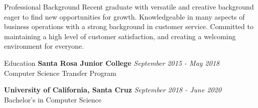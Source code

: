 \documentclass{resume} %
\begin{document}

\begin{rSection}{Professional Background}
    Recent graduate with versatile and creative background eager to find new 
    opportunities for growth. 
    Knowledgeable in many aspects of business operations with a strong background in customer service.
    Committed to maintaining a high level of 
    customer satisfaction, and creating a welcoming environment for everyone.

\end{rSection}

\begin{rSection}{Education}
    {\bf Santa Rosa Junior College} \hfill {\em September 2015 - May 2018} \\ 
    Computer Science Transfer Program

    {\bf University of California, Santa Cruz} \hfill {\em September 2018 - June 2020} \\ 
    Bachelor's in Computer Science

\end{rSection}



\end{document}
